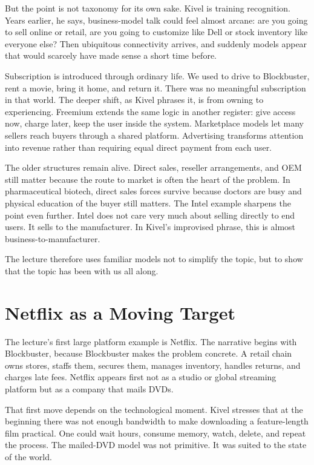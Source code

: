 But the point is not taxonomy for its own sake. Kivel is training recognition. Years earlier, he says, business-model talk could feel almost arcane: are you going to sell online or retail, are you going to customize like Dell or stock inventory like everyone else? Then ubiquitous connectivity arrives, and suddenly models appear that would scarcely have made sense a short time before.

Subscription is introduced through ordinary life. We used to drive to Blockbuster, rent a movie, bring it home, and return it. There was no meaningful subscription in that world. The deeper shift, as Kivel phrases it, is from owning to experiencing. Freemium extends the same logic in another register: give access now, charge later, keep the user inside the system. Marketplace models let many sellers reach buyers through a shared platform. Advertising transforms attention into revenue rather than requiring equal direct payment from each user.

The older structures remain alive. Direct sales, reseller arrangements, and OEM still matter because the route to market is often the heart of the problem. In pharmaceutical biotech, direct sales forces survive because doctors are busy and physical education of the buyer still matters. The Intel example sharpens the point even further. Intel does not care very much about selling directly to end users. It sells to the manufacturer. In Kivel's improvised phrase, this is almost business-to-manufacturer.

The lecture therefore uses familiar models not to simplify the topic, but to show that the topic has been with us all along.

\section{Netflix as a Moving Target}

The lecture's first large platform example is Netflix. The narrative begins with Blockbuster, because Blockbuster makes the problem concrete. A retail chain owns stores, staffs them, secures them, manages inventory, handles returns, and charges late fees. Netflix appears first not as a studio or global streaming platform but as a company that mails DVDs.

That first move depends on the technological moment. Kivel stresses that at the beginning there was not enough bandwidth to make downloading a feature-length film practical. One could wait hours, consume memory, watch, delete, and repeat the process. The mailed-DVD model was not primitive. It was suited to the state of the world.

